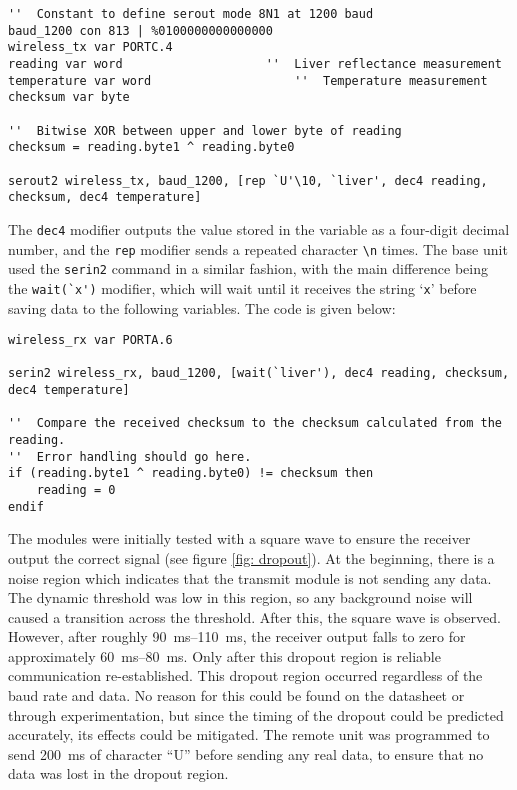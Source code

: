 \begin{lstlisting}
''  Constant to define serout mode 8N1 at 1200 baud
baud_1200 con 813 | %0100000000000000
wireless_tx var PORTC.4
reading var word 					''  Liver reflectance measurement
temperature var word					''  Temperature measurement
checksum var byte

''  Bitwise XOR between upper and lower byte of reading
checksum = reading.byte1 ^ reading.byte0

serout2 wireless_tx, baud_1200, [rep `U'\10, `liver', dec4 reading, checksum, dec4 temperature]
\end{lstlisting}

The \verb|dec4| modifier outputs the value stored in the variable as a four-digit decimal number, and the \verb|rep| modifier sends a repeated character \verb|\n| times. The base unit used the \verb|serin2| command in a similar fashion, with the main difference being the \verb|wait(`x')| modifier, which will wait until it receives the string `\verb|x|' before saving data to the following variables. The code is given below:

\begin{lstlisting}
wireless_rx var PORTA.6

serin2 wireless_rx, baud_1200, [wait(`liver'), dec4 reading, checksum, dec4 temperature]

''  Compare the received checksum to the checksum calculated from the reading. 
''  Error handling should go here.
if (reading.byte1 ^ reading.byte0) != checksum then
    reading = 0
endif
\end{lstlisting}








The modules were initially tested with a square wave to ensure the receiver output the correct signal (see figure \ref{fig: dropout}). At the beginning, there is a noise region which indicates that the transmit module is not sending any data. The dynamic threshold was low in this region, so any background noise will caused a transition across the threshold. After this, the square wave is observed. However, after roughly \SIrange{90}{110}{\milli\second}, the receiver output falls to zero for approximately \SIrange{60}{80}{\milli\second}. Only after this dropout region is reliable communication re-established. This dropout region occurred regardless of the baud rate and data. No reason for this could be found on the datasheet or through experimentation, but since the timing of the dropout could be predicted accurately, its effects could be mitigated. The remote unit was programmed to send \SI{200}{\milli\second} of character ``U'' before sending any real data, to ensure that no data was lost in the dropout region.\\

